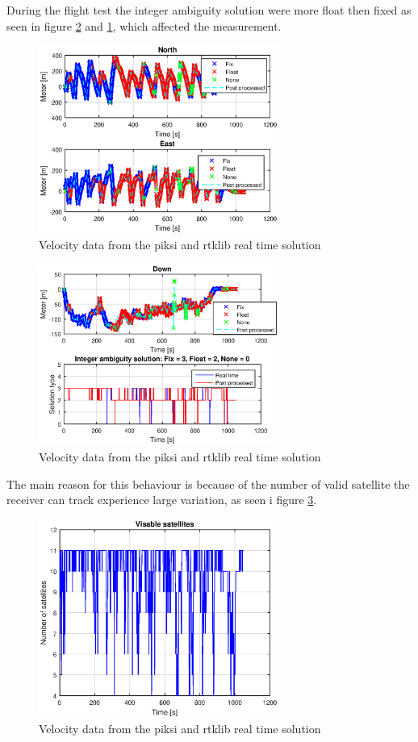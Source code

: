 During the flight test the integer ambiguity solution were more float then fixed as seen in figure \ref{figure:DownFlight} and \ref{figure:northEastFlight}, which affected the measurement. 
\begin{figure}[H]
	\centering
		\includegraphics[width=0.7\textwidth]{figs/plots/northEastFlight.eps}
		\caption{Velocity data from the piksi and rtklib real time solution}
		\label{figure:northEastFlight}
\end{figure}
\begin{figure}[H]
	\centering
		\includegraphics[width=0.7\textwidth]{figs/plots/downFlight.eps}
		\caption{Velocity data from the piksi and rtklib real time solution}
		\label{figure:DownFlight}
\end{figure}
The main reason for this behaviour is because of the number of valid satellite the receiver can track experience large variation, as seen i figure \ref{figure:numSatFlight}.
\begin{figure}[H]
	\centering
		\includegraphics[width=0.7\textwidth]{figs/plots/numSatFlight.eps}
		\caption{Velocity data from the piksi and rtklib real time solution}
		\label{figure:numSatFlight}
\end{figure}
